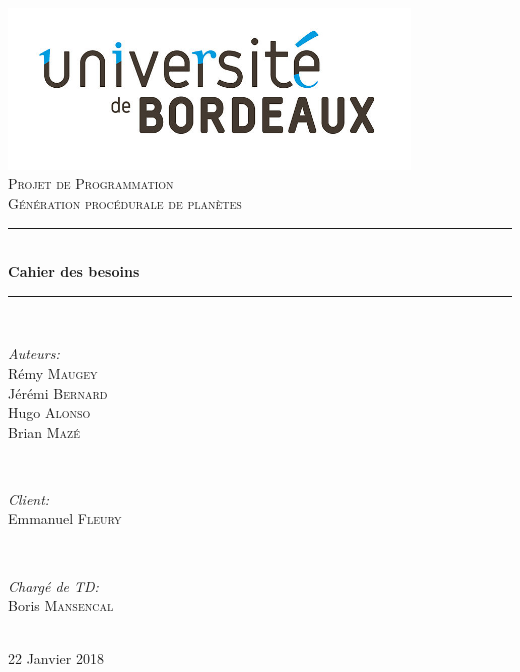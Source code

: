 \documentclass[12pt]{report}
\begin{document}

\begin{titlepage}

\newcommand{\HRule}{\rule{\linewidth}{0.7mm}} %

\center
 
\includegraphics[width=0.8\textwidth]{img/logo.jpg}\\

\textsc{\Large Projet de Programmation}\\[0.5cm]
\textsc{\large Génération procédurale de planètes}\\[0.5cm]


\HRule \\[0.4cm]
{ \huge \bfseries Cahier des besoins}\\[0.4cm]
\HRule \\[1.5cm]
 

\begin{minipage}{0.4\textwidth}
\begin{flushleft} \large
\emph{Auteurs:}\\
Rémy \textsc{Maugey}\\
Jérémi \textsc{Bernard}\\
Hugo \textsc{Alonso}\\
Brian \textsc{Mazé}\\
\end{flushleft}
\end{minipage}
~
\begin{minipage}{0.4\textwidth}
\begin{flushright} \large
\emph{Client:} \\
Emmanuel \textsc{Fleury}
\end{flushright}
~
\begin{flushright} \large
\emph{Chargé de TD:} \\
Boris \textsc{Mansencal}
\end{flushright}
\end{minipage}\\[2cm]


{\large 22 Janvier 2018}\\[2cm] 


\vfill %

\end{titlepage}
\end{document}
